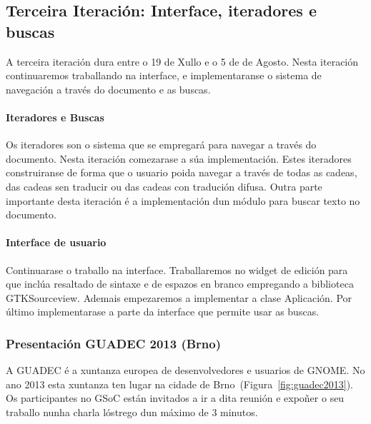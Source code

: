\subsection{Terceira Iteración: Interface, iteradores e buscas}
A terceira iteración dura entre o 19 de Xullo e o 5 de de Agosto. Nesta iteración continuaremos traballando na interface, e implementaranse o sistema de navegación a través do documento e as buscas.

\paragraph{Iteradores e Buscas}
Os iteradores son o sistema que se empregará para navegar a través do documento. Nesta iteración comezarase a súa implementación. Estes iteradores construiranse de forma que o usuario poida navegar a través de todas as cadeas, das cadeas sen traducir ou das cadeas con tradución difusa. Outra parte importante desta iteración é a implementación dun módulo para buscar texto no documento.

\paragraph{Interface de usuario}
Continuarase o traballo na interface. Traballaremos no widget de edición para que inclúa resaltado de sintaxe e de espazos en branco empregando a biblioteca GTKSourceview. Ademais empezaremos a implementar a clase Aplicación. Por último implementarase a parte da interface que permite usar as buscas.


\subsubsection{Presentación GUADEC 2013 (Brno)}
A GUADEC é a xuntanza europea de desenvolvedores e usuarios de GNOME. No ano 2013 esta xuntanza ten lugar na cidade de Brno~(Figura~\ref{fig:guadec2013}). Os participantes no GSoC están invitados a ir a dita reunión e expoñer o seu traballo nunha charla lóstrego dun máximo de 3 minutos.

